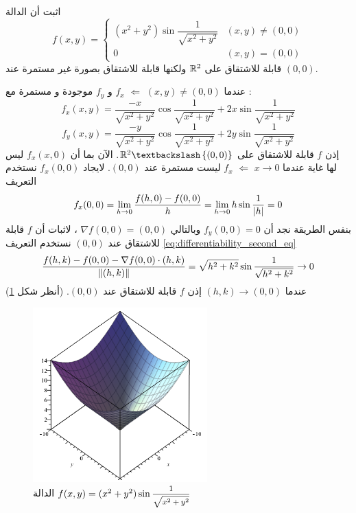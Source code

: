 \begin{example}
    اثبت أن الدالة
    \[
    f(x,y)=\begin{cases}
        (x^2+y^2)\sin{\dfrac{1}{\sqrt{x^2+y^2}}}&(x,y)\neq(0,0)\\
        0&(x,y)=(0,0)
    \end{cases}
    \]
    قابلة للاشتقاق على $\mathbb{R}^2$ ولكنها قابلة للاشتقاق بصورة غير مستمرة عند $(0,0)$.
\end{example}
\begin{myproof}
    عندما $(x,y)\neq(0,0)$ $\Leftarrow$ $f_x$ و $f_y$ موجودة و مستمرة مع :
    \[
    f_x(x,y)=\frac{-x}{\sqrt{x^2+y^2}}\cos\dfrac{1}{\sqrt{x^2+y^2}}+2x\sin{\dfrac{1}{\sqrt{x^2+y^2}}}
    \]
    \[
    f_y(x,y)=\frac{-y}{\sqrt{x^2+y^2}}\cos\dfrac{1}{\sqrt{x^2+y^2}}+2y\sin{\dfrac{1}{\sqrt{x^2+y^2}}}
    \]
    إذن $f$ قابلة للاشتقاق على $\R^2\textbackslash\cbracket{(0,0)}$. الآن بما أن $f_x(x,0)$ ليس لها غاية عندما $x\to0$ $\Leftarrow$ $f_x$ ليست مستمرة عند $(0,0)$. لايجاد $f_x(0,0)$ نستخدم التعريف
\[
f_x(0,0)=\lim\limits_{h\to0}\frac{f(h,0)-f(0,0)}{h}=\lim\limits_{h\to0}h\sin\dfrac{1}{\left|h\right|}=0
\]
بنفس الطريقة نجد أن $f_y(0,0)=0$ وبالتالي $\nabla f(0,0)=(0,0)$ ، لاثبات أن $f$ قابلة للاشتقاق عند $(0,0)$ نستخدم التعريف \eqref{eq:differentiability_second_eq}
\[
\frac{f(h,k)-f(0,0)-\nabla f(0,0)\cdot(h,k)}{\left\|(h,k)\right\|}=\sqrt{h^2+k^2}\sin{\dfrac{1}{\sqrt{h^2+k^2}}}\to0
\]
عندما $(h,k)\to(0,0)$ إذن $f$ قابلة للاشتقاق عند $(0,0)$. (أنظر شكل \ref{fig:x2y2sinx2y2})
\end{myproof}
\begin{figure}[ht]
    \centering
    \includegraphics[width=0.6\textwidth]{plots/function3.png}
    \caption{الدالة $f(x,y)=(x^2+y^2)\sin\mfrac{1}{\sqrt{x^2+y^2}} $}
    \label{fig:x2y2sinx2y2}
\end{figure}
